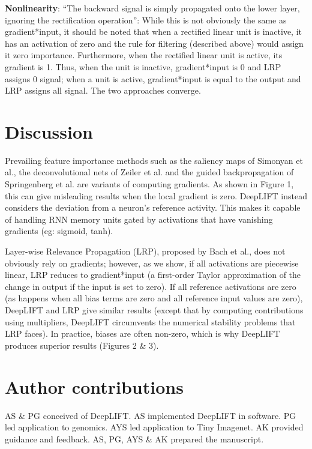 \documentclass{article}
\begin{document}
{\bf Nonlinearity}: ``The backward signal is simply propagated onto the lower layer, ignoring the rectification operation'': While this is not obviously the same as gradient*input, it should be noted that when a rectified linear unit is inactive, it has an activation of zero and the rule for filtering (described above) would assign it zero importance. Furthermore, when the rectified linear unit is active, its gradient is 1. Thus, when the unit is inactive, gradient*input is 0 and LRP assigns 0 signal; when a unit is active, gradient*input is equal to the output and LRP assigns all signal. The two approaches converge.

\section{Discussion}

Prevailing feature importance methods such as the saliency maps of Simonyan et al., the deconvolutional nets of Zeiler et al. and the guided backpropagation of Springenberg et al. are variants of computing gradients. As shown in Figure 1, this can give misleading results when the local gradient is zero. DeepLIFT instead considers the deviation from a neuron's reference activity. This makes it capable of handling RNN memory units gated by activations that have vanishing gradients (eg: sigmoid, tanh).

Layer-wise Relevance Propagation (LRP), proposed by Bach et al., does not obviously rely on gradients; however, as we show, if all activations are piecewise linear, LRP reduces to gradient*input (a first-order Taylor approximation of the change in output if the input is set to zero). If all reference activations are zero (as happens when all bias terms are zero and all reference input values are zero), DeepLIFT and LRP give similar results (except that by computing contributions using multipliers, DeepLIFT circumvents the numerical stability problems that LRP faces). In practice, biases are often non-zero, which is why DeepLIFT produces superior results (Figures 2 \& 3).

\section{Author contributions}

AS \& PG conceived of DeepLIFT. AS implemented DeepLIFT in software. PG led application to genomics. AYS led application to Tiny Imagenet. AK provided guidance and feedback. AS, PG, AYS \& AK prepared the manuscript.



\end{document}
